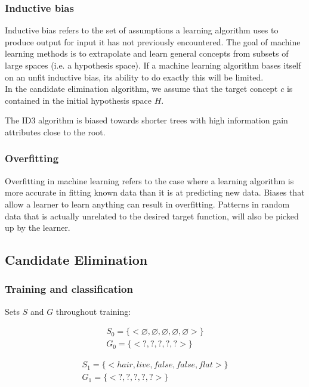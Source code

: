 \documentclass[paper=a4, fontsize=11pt]{scrartcl} %
\numberwithin{equation}{section} %
\numberwithin{figure}{section} %
\numberwithin{table}{section} %
\begin{document}
\subsubsection{Inductive bias}

Inductive bias refers to the set of assumptions a learning algorithm uses to produce output for input it has not previously encountered.
The goal of machine learning methods is to extrapolate and learn general concepts from subsets of large spaces (i.e. a hypothesis space).
If a machine learning algorithm bases itself on an unfit inductive bias, its ability to do exactly this will be limited. \\

In the candidate elimination algorithm, we assume that the target concept $c$ is contained in the initial hypothesis space $H$.

The ID3 algorithm is biased towards shorter trees with high information gain attributes close to the root.

\subsubsection{Overfitting}

Overfitting in machine learning refers to the case where a learning algorithm is more accurate in fitting known data than it is at predicting new data.
Biases that allow a learner to learn anything can result in overfitting.
Patterns in random data that is actually unrelated to the desired target function, will also be picked up by the learner.

\subsection{Candidate Elimination}

\subsubsection{Training and classification}

Sets $S$ and $G$ throughout training:

\begin{gather*}
    S_0 = \{<\varnothing, \varnothing, \varnothing, \varnothing, \varnothing>\} \\
    G_0 = \{<?, ?, ?, ?, ?>\}
\end{gather*}

\begin{gather*}
    S_1 = \{<hair, live, false, false, flat>\} \\
    G_1 = \{<?, ?, ?, ?, ?>\}
\end{gather*}
\end{document}
